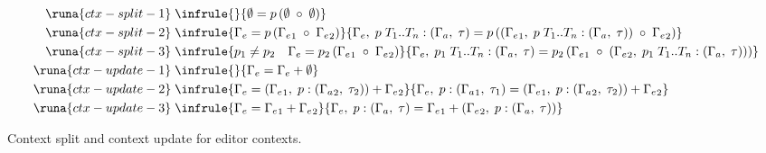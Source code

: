 \begin{table*}[htp]
    \centering
    \begin{align*}
        \runa{ctx-split-1}&\; \infrule{}{\emptyset = p \left(\emptyset\; \circ\; \emptyset\right)}\\
        \runa{ctx-split-2}&\; \infrule{\Gamma_e = p \left({\Gamma_e}_1\; \circ\; {\Gamma_e}_2\right)}{\Gamma_e,\; p\; T_1..T_n: (\Gamma_a,\; \tau) = p \left(\left({\Gamma_e}_1,\; p\; T_1..T_n: (\Gamma_a,\; \tau)\right)\; \circ\; {\Gamma_e}_2\right)}\\
        \runa{ctx-split-3}&\; \infrule{p_1 \neq p_2 \quad \Gamma_e = p_2 \left({\Gamma_e}_1\; \circ\; {\Gamma_e}_2\right)}{\Gamma_e,\; p_1\; T_1..T_n: (\Gamma_a,\; \tau) = p_2 \left({\Gamma_e}_1\; \circ\; \left({\Gamma_e}_2,\; p_1\; T_1..T_n: (\Gamma_a,\; \tau)\right)\right)}\\
        \runa{ctx-update-1}&\; \infrule{}{\Gamma_e = \Gamma_e + \emptyset}\\
        \runa{ctx-update-2}&\; \infrule{\Gamma_e = \left({\Gamma_e}_1,\; p: ({\Gamma_a}_2,\; \tau_2)\right) + {\Gamma_e}_2}{\Gamma_e,\; p: ({\Gamma_a}_1,\; \tau_1) = \left({\Gamma_e}_1,\; p: ({\Gamma_a}_2,\; \tau_2)\right) + {\Gamma_e}_2}\\
        \runa{ctx-update-3}&\; \infrule{\Gamma_e = {\Gamma_e}_1 + {\Gamma_e}_2}{\Gamma_e,\; p: (\Gamma_a,\; \tau) = {\Gamma_e}_1 + \left({\Gamma_e}_2,\; p: (\Gamma_a,\; \tau)\right)}
    \end{align*}
    \caption{Context split and context update for editor contexts.}
    \label{tab:context}
\end{table*}

